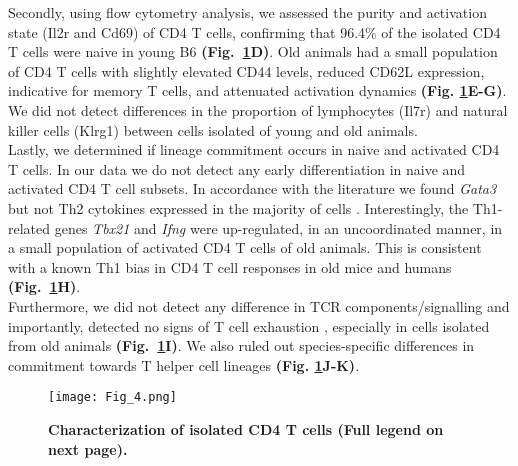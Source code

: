 Secondly, using flow cytometry analysis, we assessed the purity and activation state (Il2r\textalpha{} and Cd69) of CD4\plus{} T cells, confirming that 96.4\% of the isolated CD4\plus{} T cells were naive in young B6 \textbf{(Fig.~\ref{fig1:characterization}D)}. Old animals had a small population of CD4\plus{} T cells with slightly elevated CD44 levels, reduced CD62L expression, indicative for memory T cells, and attenuated activation dynamics \textbf{(Fig. \ref{fig1:characterization}E-G)}. We did not detect differences in the proportion of lymphocytes (Il7r) and natural killer cells (Klrg1) between cells isolated of young and old animals. \\

Lastly, we determined if lineage commitment occurs in naive and activated CD4\plus{} T cells. In our data we do not detect any early differentiation in naive and activated CD4\plus{} T cell subsets. In accordance with the literature we found \textit{Gata3} but not Th2 cytokines expressed in the majority of cells  \citep{Ho2009}. Interestingly, the Th1-related genes \textit{Tbx21} and \textit{Ifng} were up-regulated, in an uncoordinated manner, in a small population of activated CD4\plus{} T cells of old animals. This is consistent with a known Th1 bias in CD4\plus{} T cell responses in old mice \citep{Zhang2014} and humans \citep{Sakata-Kaneko2000} \textbf{(Fig.~\ref{fig1:characterization}H)}. \\

Furthermore, we did not detect any difference in TCR components/signalling and importantly, detected no signs of T cell exhaustion \citep{Wherry2011}, especially in cells isolated from old animals \textbf{(Fig.~\ref{fig1:characterization}I)}. We also ruled out species-specific differences in commitment towards T helper cell lineages \textbf{(Fig. \ref{fig1:characterization}J-K)}. 

\newpage

\begin{figure}[!hb]
\centering
\texttt{[image: Fig\_4.png]}
\caption[Characterization of isolated CD4\plus{} T cells]{\textbf{Characterization of isolated CD4\plus{} T cells (Full legend on next page).}}
\label{fig1:characterization}
\end{figure}

